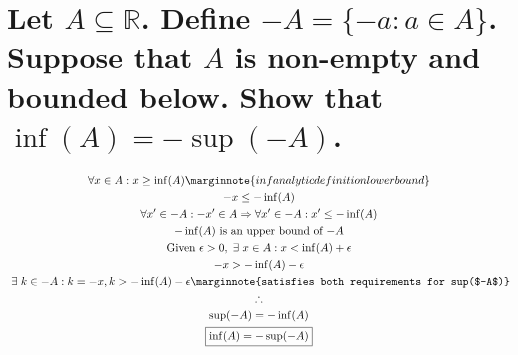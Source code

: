 \documentclass[letterpaper]{article}
\begin{document}
\section{Let $A \subseteq \mathbb{R}$. Define $-A=\{-a:a\in A\}$. Suppose that $A$ is non-empty and bounded below. Show that
$\inf(A)=-\sup(-A)$.}
\begin{gather*}
\forall x \in A: x \geq \inf(A) \marginnote{inf analytic definition lower bound} \\
-x\leq-\inf(A) \\
\forall x'\in -A: -x'\in A \Rightarrow \forall x'\in -A: x' \leq-\inf(A) \\
-\inf(A) \text{ is an upper bound of $-A$} \\ 
\text{Given } \epsilon>0,\hspace{3pt}\exists\hspace{3pt}x\in A:x<\inf(A)+\epsilon \\
-x > -\inf(A) - \epsilon \\
\hspace{3pt}\exists\hspace{3pt}k\in -A:k=-x,k>-\inf(A)-\epsilon \marginnote{satisfies both requirements for sup($-A$)} \\
\therefore \\
\sup(-A)=-\inf(A) \\
\boxed{\inf(A)=-\sup(-A)}
\end{gather*}
\end{document}
